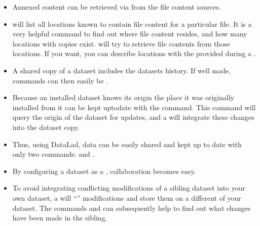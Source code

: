 \begin{itemize}
\item {} 
\sphinxAtStartPar
Annexed content can be retrieved via  from the
file content sources.

\item {} 
\sphinxAtStartPar
{} will list all locations known to contain file
content for a particular file. It is a very
helpful command to find out where file content resides, and how many
locations with copies exist. {\hyperref[\detokenize{glossary:term-git-annex}]{}} will try to retrieve file contents from those locations. If you want, you can describe locations with the
 provided during a .

\item {} 
\sphinxAtStartPar
A shared copy of a dataset includes the datasets history. If well made,
 commands can then easily be .

\item {} 
\sphinxAtStartPar
Because an installed dataset knows its origin \textendash{} the place it was
originally installed from \textendash{} it can be kept up\sphinxhyphen{}to\sphinxhyphen{}date with the
 command. This command will query the origin of the
dataset for updates, and a  will integrate
these changes into the dataset copy.

\item {} 
\sphinxAtStartPar
Thus, using DataLad, data can be easily shared and kept up to date
with only two commands:  and .

\item {} 
\sphinxAtStartPar
By configuring a dataset as a {\hyperref[\detokenize{glossary:term-sibling}]{}}, collaboration becomes easy.

\item {} 
\sphinxAtStartPar
To avoid integrating conflicting modifications of a sibling dataset into your
own dataset, a  will “” modifications
and store them on a different {\hyperref[\detokenize{glossary:term-branch}]{}} of your dataset. The commands
 and  can subsequently help to find
out what changes have been made in the sibling.

\end{itemize}


